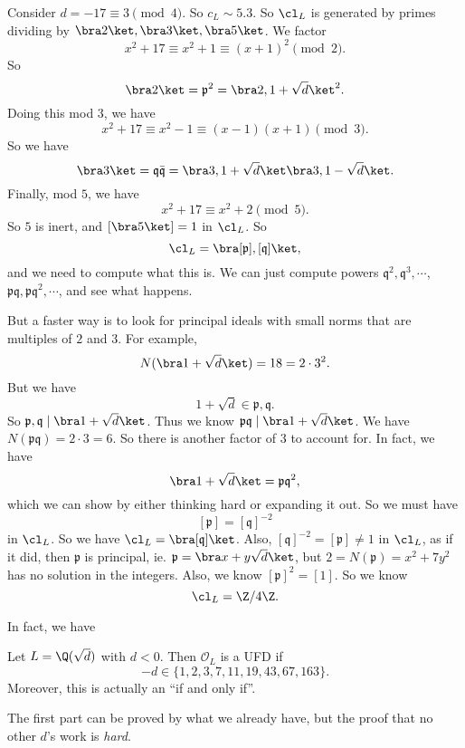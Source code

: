 \documentclass[a4paper]{article}
\begin{document}
\begin{eg}
  Consider $d = -17 \equiv 3 \pmod 4$. So $c_L \sim 5.3$. So $\cl_L$ is generated by primes dividing by $\bra 2\ket, \bra 3\ket, \bra 5\ket$. We factor
  \[
    x^2 + 17 \equiv x^2 + 1 \equiv (x + 1)^2 \pmod 2.
  \]
  So
  \[
    \bra 2\ket = \mathfrak{p}^2 = \bra 2, 1 + \sqrt{d}\ket^2.
  \]
  Doing this mod $3$, we have
  \[
    x^2 + 17 \equiv x^2 - 1 \equiv (x - 1)(x + 1) \pmod 3.
  \]
  So we have
  \[
    \bra 3\ket = \mathfrak{q}\bar{\mathfrak{q}} = \bra 3, 1 + \sqrt{d}\ket \bra 3, 1 - \sqrt{d}\ket.
  \]
  Finally, mod $5$, we have
  \[
    x^2 + 17 \equiv x^2 + 2 \pmod 5.
  \]
  So $5$ is inert, and $[\bra 5\ket] = 1$ in $\cl_L$. So
  \[
    \cl_L = \bra [\mathfrak{p}], [\mathfrak{q}]\ket,
  \]
  and we need to compute what this is. We can just compute powers $\mathfrak{q}^2, \mathfrak{q}^3, \cdots$, $\mathfrak{p}\mathfrak{q}, \mathfrak{p}\mathfrak{q}^2, \cdots$, and see what happens.

  But a faster way is to look for principal ideals with small norms that are multiples of $2$ and $3$. For example,
  \[
    N(\bra 1 + \sqrt{d}\ket) = 18 = 2 \cdot 3^2.
  \]
  But we have
  \[
    1 + \sqrt{d} \in \mathfrak{p}, \mathfrak{q}.
  \]
  So $\mathfrak{p}, \mathfrak{q} \mid \bra 1 + \sqrt{d}\ket$. Thus we know $\mathfrak{p}\mathfrak{q} \mid \bra 1 + \sqrt{d}\ket$. We have $N(\mathfrak{p}\mathfrak{q}) = 2 \cdot 3 = 6$. So there is another factor of $3$ to account for. In fact, we have
  \[
    \bra 1 + \sqrt{d}\ket = \mathfrak{p}\mathfrak{q}^2,
  \]
  which we can show by either thinking hard or expanding it out. So we must have
  \[
    [\mathfrak{p}] = [\mathfrak{q}]^{-2}
  \]
  in $\cl_L$. So we have $\cl_L = \bra [\mathfrak{q}]\ket$. Also, $[\mathfrak{q}]^{-2} = [\mathfrak{p}] \not= 1$ in $\cl_L$, as if it did, then $\mathfrak{p}$ is principal, ie. $\mathfrak{p} = \bra x + y\sqrt{d}\ket$, but $2 = N(\mathfrak{p}) = x^2 + 7y^2$ has no solution in the integers. Also, we know $[\mathfrak{p}]^2 = [1]$. So we know
  \[
    \cl_L = \Z/4\Z.
  \]
\end{eg}

In fact, we have
\begin{thm}
  Let $L = \Q(\sqrt{d})$ with $d < 0$. Then $\mathcal{O}_L$ is a UFD if
  \[
    -d \in \{1, 2, 3, 7, 11, 19, 43, 67, 163\}.
  \]
  Moreover, this is actually an ``if and only if''.
\end{thm}
The first part can be proved by what we already have, but the proof that no other $d$'s work is \emph{hard}.
\end{document}
